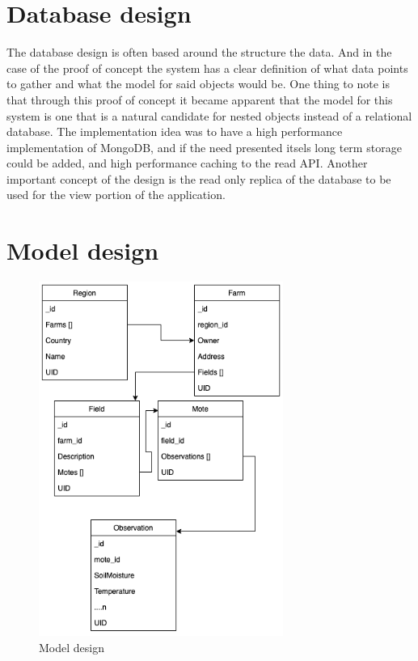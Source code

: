 \documentclass[]{uiophd}
\begin{document}
\section{Database design}
The database design is often based around the structure the data. And in the case of the proof of concept the system has a clear definition of what data points to gather and what the model for said objects would be. One thing to note is that through this proof of concept it became apparent that the model for this system is one that is a natural candidate for nested objects instead of a relational database. The implementation idea was to have a high performance implementation of MongoDB, and if the need presented itsels long term storage could be added, and high performance caching to the read API. Another important concept of the design is the read only replica of the database to be used for the view portion of the application.
\section{Model design}
\begin{figure}[h]
\caption{Model design}
\centering
\includegraphics[width=8cm]{model_golden.png}
\end{figure}
\end{document}
